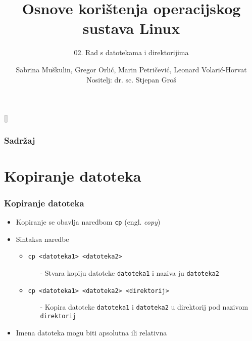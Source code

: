 \documentclass{beamer}
\title{Osnove korištenja operacijskog sustava Linux}
\subtitle{02. Rad s datotekama i direktorijima}
\author[Sabrina Miškulin, Gregor Orlić, Marin Petričević, Leonard Volarić-Horvat]{Sabrina Muškulin, Gregor Orlić, Marin Petričević, Leonard Volarić-Horvat\\{\small Nositelj: dr. sc. Stjepan Groš}}
\institute[FER]{Sveučilište u Zagrebu \\
				Fakultet elektrotehnike i računarstva}
\date{\todayiso}
\begin{document}
[]

\begin{frame}
\maketitle
\end{frame}

\begin{frame}
\frametitle{Sadržaj}
\tableofcontents
\end{frame}

\section{Kopiranje datoteka}
\begin{frame}[t]
\frametitle{Kopiranje datoteka}
\begin{itemize}
  \item Kopiranje se obavlja naredbom \texttt{cp} (engl. \emph{copy})
  \item Sintaksa naredbe
  \begin{itemize}
    \item \texttt{cp \textless datoteka1\textgreater
                     \textless datoteka2\textgreater}
    \begin{itemize}
      \item[-] Stvara kopiju datoteke \texttt{datoteka1} i naziva ju
               \texttt{datoteka2}
    \end{itemize}
    \item \texttt{cp \textless datoteka1\textgreater
                     \textless datoteka2\textgreater
                     \textless direktorij\textgreater}
    \begin{itemize}
      \item[-] Kopira datoteke \texttt{datoteka1} i \texttt{datoteka2} u
               direktorij pod nazivom \texttt{direktorij}
    \end{itemize}
  \end{itemize}
  \item Imena datoteka mogu biti apsolutna ili relativna
\end{itemize}
\end{frame}
\end{document}
